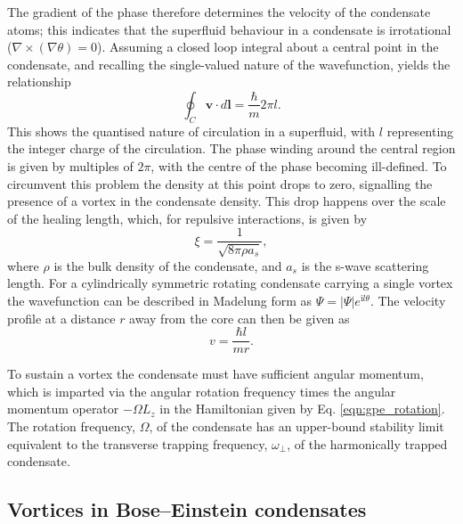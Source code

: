 The gradient of the phase therefore determines the velocity of the condensate atoms; this indicates that the superfluid behaviour in a condensate is irrotational ($\nabla\times(\nabla\theta) =0$). Assuming a closed loop integral about a central point in the condensate, and recalling the single-valued nature of the wavefunction, yields the relationship
\begin{equation}\label{eqn:circulation}
\oint_C \textbf{v}\cdot d\textbf{l} = \frac{\hbar}{m}2\pi l.
\end{equation}
This shows the quantised nature of circulation in a superfluid, with $l$ representing the integer charge of the circulation. The phase winding around the central region is given by multiples of $2\pi$, with the centre of the phase becoming ill-defined. To circumvent this problem the density at this point drops to zero, signalling the presence of a vortex in the condensate density. This drop happens over the scale of the healing length, which, for repulsive interactions, is given by
\begin{equation}
\xi = \frac{1}{\sqrt{8\pi \rho a_s}},
\end{equation}
where $\rho$ is the bulk density of the condensate, and $a_s$ is the s-wave scattering length. For a cylindrically symmetric rotating condensate carrying a single vortex the wavefunction can be described in Madelung form as $\Psi = |\Psi|e^{\textrm{i}l\theta}$. The velocity profile at a distance $r$ away from the core can then be given as
\begin{equation}\label{eqn:1_over_r}
    v =\frac{\hbar l}{m r}.
\end{equation}

To sustain a vortex the condensate must have sufficient angular momentum, which is imparted via the angular rotation frequency times the angular momentum operator $-\Omega L_z$ in the Hamiltonian given by Eq. \eqref{eqn:gpe_rotation}. The rotation frequency, $\Omega$, of the condensate has an upper-bound stability limit equivalent to the transverse trapping frequency, $\omega_{\perp}$, of the harmonically trapped condensate.

\subsection{Vortices in Bose--Einstein condensates}\label{ss:vorticesinbec}

